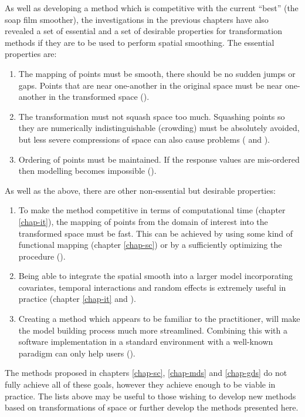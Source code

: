 As well as developing a method which is competitive with the current ``best'' (the soap film smoother), the investigations in the previous chapters have also revealed a set of essential and a set of \label{cor-r57}desirable properties for transformation methods if they are to be used to perform spatial smoothing. The essential properties are:
\begin{enumerate}
\item The mapping of points must be smooth, there should be no sudden jumps or gaps. Points that are near one-another in the original space must be near one-another in the transformed space ().
\item The transformation must not squash space too much. Squashing points so they are numerically indistinguishable (crowding) must be absolutely avoided, but less severe compressions of space can also cause problems ( and ).
\item Ordering of points must be maintained. If the response values are mis-ordered then modelling becomes impossible ().
\end{enumerate}
As well as the above, there are other non-essential but desirable properties:
\begin{enumerate}
\item To make the method competitive in terms of computational time (chapter \ref{chap-it}), the mapping of points from the domain of interest into the transformed space must be fast. This can be achieved by using some kind of functional mapping (chapter \ref{chap-sc}) or by a sufficiently optimizing the procedure ().
\item Being able to integrate the spatial smooth into a larger model incorporating covariates, temporal interactions and random effects is extremely useful in practice (chapter \ref{chap-it} and ).
\item Creating a method which appears to be familiar to the practitioner, will make the model building process much more streamlined. Combining this with a software implementation in a standard environment with a well-known paradigm can only help users ().
\end{enumerate}

The methods proposed in chapters \ref{chap-sc}, \ref{chap-mds} and \ref{chap-gds} do not fully achieve all of these goals, however they achieve enough to be viable in practice. The lists above may be useful to those wishing to develop new methods based on transformations of space or further develop the methods presented here.

